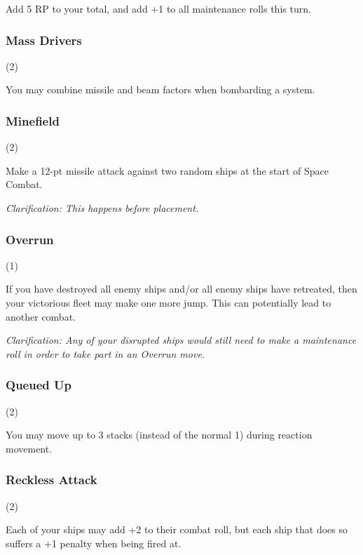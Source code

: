 
Add 5 RP to your total, and add +1 to all maintenance rolls this turn.

\subsubsection{Mass Drivers} (2)


You may combine missile and beam factors when bombarding a system.

\subsubsection{Minefield} (2)


Make a 12-pt missile attack against two random ships at the start of Space Combat.

\textit{Clarification: This happens before placement.}

\subsubsection{Overrun} (1)


If you have destroyed all enemy ships and/or all enemy ships have retreated, then your victorious fleet may make one more jump. This can potentially lead to another combat.

\textit{Clarification: Any of your disrupted ships would still need to make a maintenance roll in order to take part in an Overrun move.}

\subsubsection{Queued Up} (2)


You may move up to 3 stacks (instead of the normal 1) during reaction movement.

\subsubsection{Reckless Attack} (2)


Each of your ships may add +2 to their combat roll, but each ship that does so suffers a +1 penalty when being fired at.

